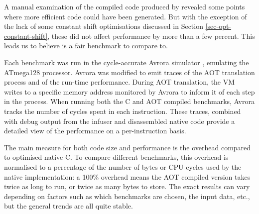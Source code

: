 A manual examination of the compiled code produced by  revealed some points where more efficient code could have been generated. But with the exception of the lack of some constant shift optimisations discussed in Section \ref{sec-opt-constant-shift}, these did not affect performance by more than a few percent. This leads us to believe  is a fair benchmark to compare to.

Each benchmark was run in the cycle-accurate Avrora simulator \cite{Titzer:2005vb}, emulating the ATmega128 processor. Avrora was modified to emit traces of the AOT translation process and of the run-time performance. During AOT translation, the VM writes to a specific memory address monitored by Avrora to inform it of each step in the process. When running both the C and AOT compiled benchmarks, Avrora tracks the number of cycles spent in each instruction. These traces, combined with debug output from the infuser and disassembled native code provide a detailed view of the performance on a per-instruction basis.

The main measure for both code size and performance is the overhead compared to optimised native C. To compare different benchmarks, this overhead is normalised to a percentage of the number of bytes or CPU cycles used by the native implementation: a 100\% overhead means the AOT compiled version takes twice as long to run, or twice as many bytes to store. The exact results can vary depending on factors such as which benchmarks are chosen, the input data, etc., but the general trends are all quite stable.

